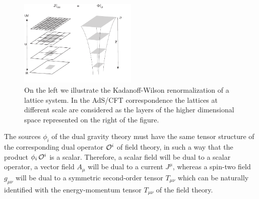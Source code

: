 \documentclass[12pt,notitlepage,a4paper]{article}
\begin{document}
\begin{figure}[ht]
\center
\includegraphics[width=0.5\textwidth]{kada.pdf}
\caption{On the left we illustrate the Kadanoff-Wilson renormalization of a lattice system. In the AdS/CFT correspondence the lattices at different scale are considered as the  layers of the higher dimensional space represented on the right of the figure.} 
\label{Kadanoff}
\end{figure}




The sources $\phi_i$ of the dual gravity theory must have the same tensor structure of the corresponding dual operator ${\cal O}^i$ of field theory, in such a way that the product $\phi_i\,{\cal O}^i$ is a scalar. Therefore, a scalar field will be dual to a scalar operator, a vector field $A_{\mu}$ will be dual to a current $J^{\mu}$, whereas a spin-two field $g_{\mu\nu}$ will be dual to a symmetric second-order tensor $T_{\mu\nu}$ which can be naturally identified with the energy-momentum tensor $T_{\mu\nu}$ of the field theory. 
\end{document}
